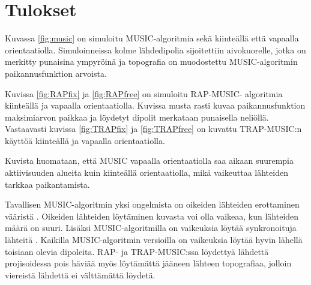 \section{Tulokset}

Kuvassa \ref{fig:music} on simuloitu MUSIC-algoritmia sekä kiinteällä että vapaalla orientaatiolla. Simuloinneissa kolme lähdedipolia sijoitettiin aivokuorelle, jotka on merkitty punaisina ympyröinä ja topografia on muodostettu MUSIC-algoritmin paikannusfunktion arvoista.

Kuvissa \ref{fig:RAPfix} ja \ref{fig:RAPfree} on simuloitu RAP-MUSIC- algoritmia kiinteällä ja vapaalla orientaatiolla. Kuvissa musta rasti kuvaa paikannusfunktion maksimiarvon paikkaa ja löydetyt dipolit merkataan punaisella neliöllä. Vastaavasti kuvissa \ref{fig:TRAPfix} ja \ref{fig:TRAPfree} on kuvattu TRAP-MUSIC:n käyttöä kiinteällä ja vapaalla orientaatiolla. 

Kuvista huomataan, että MUSIC vapaalla orientaatiolla saa aikaan suurempia aktiivisuuden alueita kuin kiinteällä orientaatiolla, mikä vaikeuttaa lähteiden tarkkaa paikantamista. 

Tavallisen MUSIC-algoritmin yksi ongelmista on oikeiden lähteiden erottaminen vääristä \citep{Mosher1998RecursiveLocalization}. Oikeiden lähteiden löytäminen kuvasta voi olla vaikeaa, kun lähteiden määrä on suuri. Lisäksi MUSIC-algoritmilla on vaikeuksia löytää synkronoituja lähteitä \citep{Mosher1999SourceMUSIC}. Kaikilla MUSIC-algoritmin versioilla on vaikeuksia löytää hyvin lähellä toisiaan olevia dipoleita. RAP- ja TRAP-MUSIC:ssa löydettyä lähdettä projisoidessa pois häviää myös löytämättä jääneen lähteen topografiaa, jolloin viereistä lähdettä ei välttämättä löydetä.


